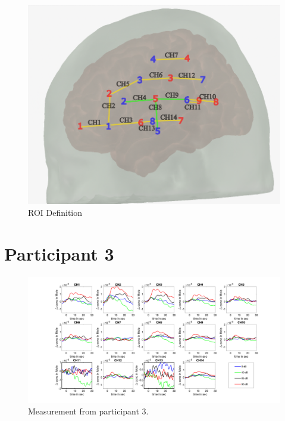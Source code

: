 \vspace{1cm}
\begin{figure}[H]
  \centering
    \includegraphics[scale=.5]{bilder/optode_roi_ink.png}
  \caption{ROI Definition}
\end{figure}

\newpage




\section {Participant 3}

\begin{figure}[H]
  \centering
    \includegraphics[scale=.4]{bilder/HbO_Mole/sub_jonas_s_HbO.png}
  \caption{Measurement from participant 3.}
  \label{fig:somesignal}
\end{figure}

